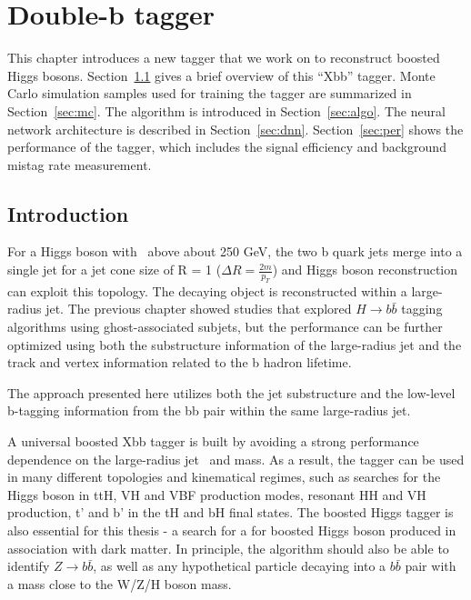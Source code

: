 \chapter{Double-b tagger}
\label{ch:xbb}

\par This chapter introduces a new tagger that we work on to reconstruct boosted Higgs bosons. Section~\ref{sec:intro} gives a brief overview of this ``Xbb'' tagger. 
Monte Carlo simulation samples used for training the tagger are summarized in Section~\ref{sec:mc}.
The algorithm is introduced in Section~\ref{sec:algo}. The neural network architecture is described in Section~\ref{sec:dnn}. 
Section~\ref{sec:per} shows the performance of the tagger, which includes the signal efficiency and background mistag rate measurement.

\section{Introduction}
\label{sec:intro}

\par For a Higgs boson with \pt~above about 250 GeV, the two b quark jets merge into a single jet for a jet cone size of R = 1 ($\Delta R = \frac{2m}{p_T}$) and Higgs boson reconstruction can exploit this topology. The decaying object is reconstructed within a large-radius jet. 
The previous chapter showed studies that explored $H\rightarrow b\bar{b}$ tagging algorithms using ghost-associated subjets, 
but the performance can be further optimized using both the substructure information of the large-radius jet and the track and vertex information related to the b hadron lifetime. 
\par The approach presented here utilizes both the jet substructure and the low-level b-tagging information from the bb pair within the same large-radius jet.

\par A universal boosted Xbb tagger is built by avoiding a strong performance dependence on the large-radius jet \pt~and mass. As a result, 
the tagger can be used in many different topologies and kinematical regimes, such as searches for the Higgs boson in ttH, VH and VBF production modes, 
resonant HH and VH production, t' and b' in the tH and bH final states. The boosted Higgs tagger is also essential for this thesis - a search for a for boosted Higgs boson produced in association with dark matter. 
In principle, the algorithm should also be able to identify $Z\rightarrow b\bar{b}$, as well as any hypothetical particle decaying into a $b\bar{b}$ pair with a mass close to the W/Z/H boson mass.

